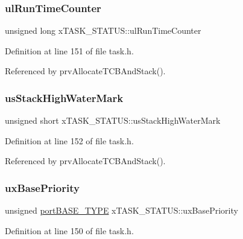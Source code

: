 \subsubsection{\texorpdfstring{ul\+Run\+Time\+Counter}{ulRunTimeCounter}}
{\footnotesize\ttfamily unsigned long x\+T\+A\+S\+K\+\_\+\+S\+T\+A\+T\+U\+S\+::ul\+Run\+Time\+Counter}



Definition at line 151 of file task.\+h.



Referenced by prv\+Allocate\+T\+C\+B\+And\+Stack().

\mbox{\label{structxTASK__STATUS_a1563de12a37cce2c0cca1b7bdea81848}} 
\subsubsection{\texorpdfstring{us\+Stack\+High\+Water\+Mark}{usStackHighWaterMark}}
{\footnotesize\ttfamily unsigned short x\+T\+A\+S\+K\+\_\+\+S\+T\+A\+T\+U\+S\+::us\+Stack\+High\+Water\+Mark}



Definition at line 152 of file task.\+h.



Referenced by prv\+Allocate\+T\+C\+B\+And\+Stack().

\mbox{\label{structxTASK__STATUS_a8bc6dc2f8978353bd749865e0df234bc}} 
\subsubsection{\texorpdfstring{ux\+Base\+Priority}{uxBasePriority}}
{\footnotesize\ttfamily unsigned \hyperlink{portmacro_8h_a1ebe82d24d764ae4e352f7c3a9f92c01}{port\+B\+A\+S\+E\+\_\+\+T\+Y\+PE} x\+T\+A\+S\+K\+\_\+\+S\+T\+A\+T\+U\+S\+::ux\+Base\+Priority}



Definition at line 150 of file task.\+h.



